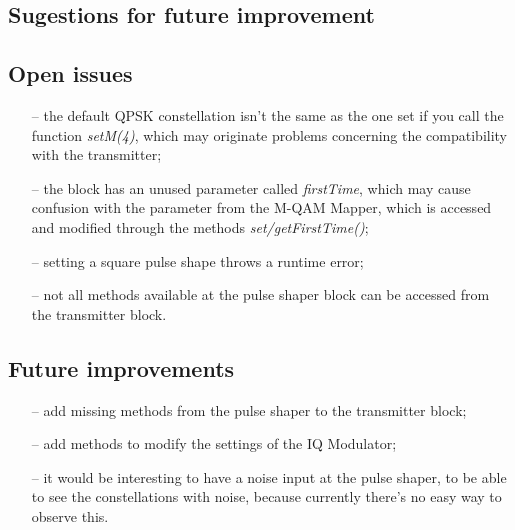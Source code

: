 
\subsection*{Sugestions for future improvement}



\subsection*{Open issues}
\begin{itemize}
  \item[--] the default QPSK constellation isn't the same as the one set if you call the function \textit{setM(4)}, which may originate problems concerning the compatibility with the transmitter;
  \item[--] the block has an unused parameter called \textit{firstTime}, which may cause confusion with the parameter from the M-QAM Mapper, which is accessed and modified through the methods \textit{set/getFirstTime()};
  \item[--] setting a square pulse shape throws a runtime error;
  \item[--] not all methods available at the pulse shaper block can be accessed from the transmitter block.
\end{itemize}
\subsection*{Future improvements}
\begin{itemize}
  \item[--] add missing methods from the pulse shaper to the transmitter block;
  \item[--] add methods to modify the settings of the IQ Modulator;
  \item[--] it would be interesting to have a noise input at the pulse shaper, to be able to see the constellations with noise, because currently there's no easy way to observe this.
\end{itemize}


